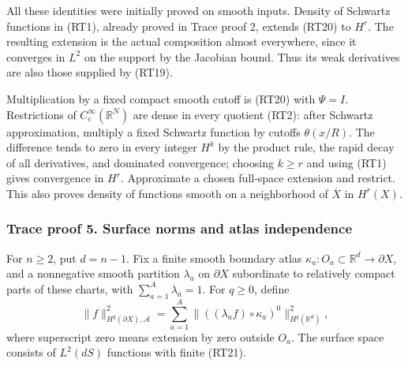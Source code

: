 \documentclass[
  11pt,
]{article}
\makeatletter
\let\ReaderOriginalAnchorStart\hyper@anchorstart
\let\ReaderOriginalAnchorEnd\hyper@anchorend
\let\ReaderPendingAliases\@empty
\def\ReaderArmAliases#1{\gdef\ReaderPendingAliases{#1}}
\def\hyper@anchorstart#1{\ReaderIfNativeAnchorTF{#1}{\ReaderPendingAliases\global\let\ReaderPendingAliases\@empty}{}\ReaderOriginalAnchorStart{#1}}
\makeatother
\begin{document}
All these identities were initially proved on smooth inputs. Density of
Schwartz functions in (RT1), already proved in Trace proof 2, extends
(RT20) to \(H^r\). The resulting extension is the actual composition
almost everywhere, since it converges in \(L^2\) on the support by the
Jacobian bound. Thus its weak derivatives are also those supplied by
(RT19).

Multiplication by a fixed compact smooth cutoff is (RT20) with
\(\Psi=I\). Restrictions of \(C_c^\infty(\mathbb R^N)\) are dense in
every quotient (RT2): after Schwartz approximation, multiply a fixed
Schwartz function by cutoffs \(\theta(x/R)\). The difference tends to
zero in every integer \(H^k\) by the product rule, the rapid decay of
all derivatives, and dominated convergence; choosing \(k\geq r\) and
using (RT1) gives convergence in \(H^r\). Approximate a chosen
full-space extension and restrict. This also proves density of functions
smooth on a neighborhood of \(\overline X\) in \(H^r(X)\).

\ReaderArmAliases{\ReaderOriginalAnchorStart{trace-proof-5-surface-norms-and-atlas-independence}\ReaderOriginalAnchorEnd\begingroup\expandafter\def\csname @currentHref\endcsname{trace-proof-5-surface-norms-and-atlas-independence}\label{trace-proof-5-surface-norms-and-atlas-independence}\endgroup\ReaderOriginalAnchorStart{trace-proof-5.-surface-norms-and-atlas-independence}\ReaderOriginalAnchorEnd}
\subsubsection{Trace proof 5. Surface norms and atlas
independence}\label{trace-proof-5.-surface-norms-and-atlas-independence}

For \(n\geq2\), put \(d=n-1\). Fix a finite smooth boundary atlas
\(\kappa_a:O_a\subset\mathbb R^d\to\partial X\), and a nonnegative
smooth partition \(\lambda_a\) on \(\partial X\) subordinate to
relatively compact parts of these charts, with
\(\sum_{a=1}^A\lambda_a=1\). For \(q\geq0\), define \[
 \|f\|_{H^q(\partial X),\mathcal A}^2
 =\sum_{a=1}^A
 \|((\lambda_af)\circ\kappa_a)^0\|_{H^q(\mathbb R^d)}^2,
 \tag{RT21}
\] where superscript zero means extension by zero outside \(O_a\). The
surface space consists of \(L^2(dS)\) functions with finite (RT21).
\end{document}

